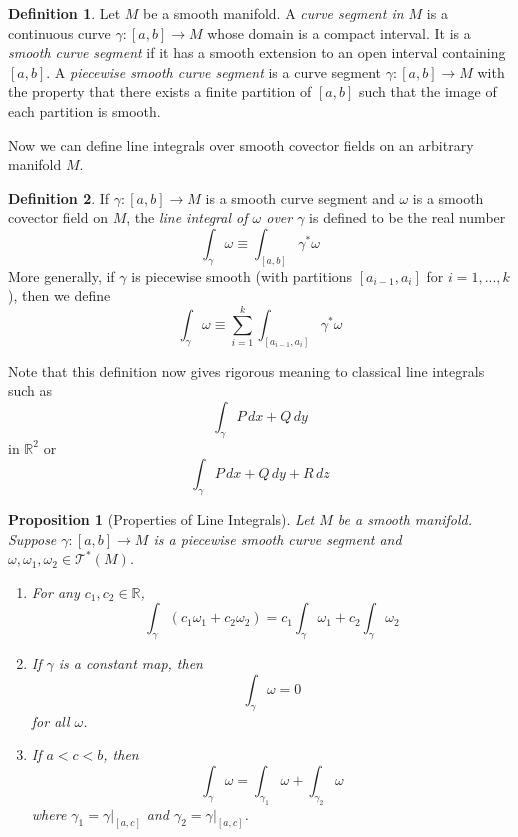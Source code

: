 \documentclass{article}
\newtheorem{proposition}[theorem]{Proposition}
\theoremstyle{remark}
\theoremstyle{definition}
\newtheorem{definition}{Definition}[section]
\begin{document}
    \begin{definition}
    Let $M$ be a smooth manifold. A \textit{curve segment in $M$} is a continuous curve $\gamma: [a,b] \longrightarrow M$ whose domain is a compact interval. It is a \textit{smooth curve segment} if it has a smooth extension to an open interval containing $[a,b]$. A \textit{piecewise smooth curve segment} is a curve segment $\gamma: [a,b] \longrightarrow M$ with the property that there exists a finite partition of $[a,b]$ such that the image of each partition is smooth. 
    \end{definition}

    Now we can define line integrals over smooth covector fields on an arbitrary manifold $M$. 

    \begin{definition}
    If $\gamma: [a,b] \longrightarrow M$ is a smooth curve segment and $\omega$ is a smooth covector field on $M$, the \textit{line integral of $\omega$ over $\gamma$} is defined to be the real number
    \[\int_\gamma \omega \equiv \int_{[a,b]} \gamma^* \omega\]
    More generally, if $\gamma$ is piecewise smooth (with partitions $[a_{i-1}, a_i]$ for $i = 1, ..., k$), then we define
    \[\int_\gamma \omega \equiv \sum_{i=1}^k \int_{[a_{i-1}, a_i]} \gamma^* \omega\]
    \end{definition}

    Note that this definition now gives rigorous meaning to classical line integrals such as 
    \[\int_\gamma P \,dx + Q\,dy\]
    in $\mathbb{R}^2$ or 
    \[\int_\gamma P\,dx + Q\,dy + R\,dz\]

    \begin{proposition}[Properties of Line Integrals]
    Let $M$ be a smooth manifold. Suppose $\gamma: [a,b] \longrightarrow M$ is a piecewise smooth curve segment and $\omega, \omega_1, \omega_2 \in \mathcal{T}^* (M)$. 
    \begin{enumerate}
        \item For any $c_1, c_2 \in \mathbb{R}$, 
        \[\int_\gamma (c_1 \omega_1 + c_2 \omega_2) = c_1 \int_\gamma \omega_1 + c_2 \int_\gamma \omega_2\]
        \item If $\gamma$ is a constant map, then 
        \[\int_\gamma \omega = 0\]
        for all $\omega$. 
        \item If $a < c < b$, then 
        \[\int_\gamma \omega = \int_{\gamma_1} \omega + \int_{\gamma_2} \omega\]
        where $\gamma_1 = \gamma \big|_{[a,c]}$ and $\gamma_2 = \gamma \big|_{[a,c]}$. 
    \end{enumerate}
    \end{proposition}
\end{document}

